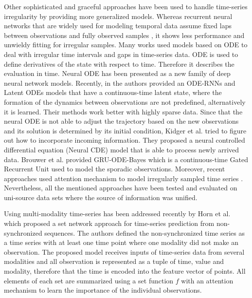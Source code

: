 \documentclass[conference]{IEEEtran}
\begin{document}
Other sophisticated and graceful approaches have been used to handle time-series irregularity by providing more generalized models. Whereas recurrent neural networks that are widely used for modeling temporal data assume fixed laps between observations and fully observed samples \cite{sherstinsky2020fundamentals}, it shows less performance and unwieldy fitting for irregular samples. Many works used models based on ODE \cite{rubanova2019latent,chen2018neural} to deal with irregular time intervals and gaps in time-series data. ODE is used to define derivatives of the state with respect to time. Therefore it describes the evaluation in time. Neural ODE \cite{chen2018neural} has been presented as a  new family of deep neural network models. Recently, in \cite{rubanova2019latent} the authors provided an ODE-RNNs and Latent ODEs models that have a continuous-time latent state, where the formation of the dynamics between observations are not predefined, alternatively it is learned. Their methods work better with highly sparse data. Since that the neural ODE is not able to adjust the trajectory based on the new observations and its solution is determined by its initial condition, Kidger et al. \cite{kidger2020neural} tried to figure out how to incorporate incoming information. They proposed a neural controlled differential equation (Neural CDE) model that is able to process newly arrived data. Brouwer et al. provided GRU-ODE-Bayes \cite{de2019gru} which is a continuous-time Gated Recurrent Unit used to model the sporadic observations. Moreover, recent approaches used attention mechanism to model irregularly sampled time series \cite{shukla2021multi}.  Nevertheless, all the mentioned approaches have been tested and evaluated on uni-source data sets where the source of information was unified. 

Using multi-modality time-series has been addressed recently by  Horn et al. \cite{horn2020set} which proposed a set network approach for time-series prediction from non-synchronized sequences. The authors defined the non-synchronized time series as a time series with at least one time point where one modality did not make an observation. The proposed model receives inputs of time-series data from several modalities and all observation is represented as a tuple of time, value and modality, therefore that the time is encoded into the feature vector of points. All elements of each set are summarized using a set function $f$ with an attention mechanism to learn the importance of the individual observations.
\end{document}
